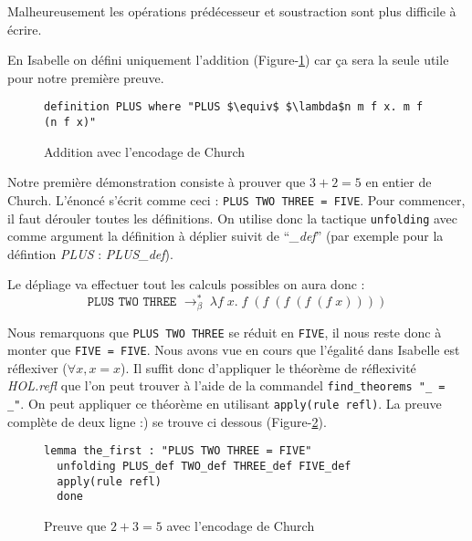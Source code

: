 \documentclass{article}
\theoremstyle{plain}
\begin{document}
  Malheureusement les opérations prédécesseur et soustraction sont plus
  difficile à écrire.

  En Isabelle on défini uniquement l'addition (Figure-\ref{fig:add}) car ça sera
  la seule utile pour notre première preuve.

    \begin{figure}[thpb]
    \begin{lstlisting}
definition PLUS where "PLUS $\equiv$ $\lambda$n m f x. m f (n f x)"
    \end{lstlisting}
    \caption{Addition avec l'encodage de Church}
    \label{fig:add}
    \end{figure}

  Notre première démonstration consiste à prouver que $3 + 2 = 5$ en entier
  de Church. L'énoncé s'écrit comme ceci : \texttt{PLUS TWO THREE = FIVE}.
  Pour commencer, il faut dérouler toutes les définitions.
  On utilise donc la tactique \texttt{unfolding} avec comme argument la
  définition à déplier suivit de ``\textit{\_def}'' (par exemple pour la
  défintion \textit{PLUS} : \textit{PLUS\_def}).

  Le dépliage va effectuer tout les calculs possibles on aura donc :
  $$
  \texttt{PLUS TWO THREE }\to^*_\beta\;\lambda f\; x.\;f\;(f\;(f\;(f\;(f\;x))))
  $$

  Nous remarquons que \texttt{PLUS TWO THREE} se réduit en \texttt{FIVE}, il
  nous reste donc à monter que \texttt{FIVE = FIVE}.
  Nous avons vue en cours que l'égalité dans Isabelle est réflexiver
  ($\forall x, x = x$). Il suffit donc d'appliquer le théorème de réflexivité
  \textit{HOL.refl} que l'on peut trouver à l'aide de la commandel
  \texttt{find\_theorems "\_ = \_"}. On peut appliquer ce théorème en utilisant
  \texttt{apply(rule refl)}. La preuve complète de deux ligne :) se trouve ci
  dessous (Figure-\ref{fig:preuve}).

    \begin{figure}[htb]
    \begin{lstlisting}
lemma the_first : "PLUS TWO THREE = FIVE"
  unfolding PLUS_def TWO_def THREE_def FIVE_def
  apply(rule refl)
  done
    \end{lstlisting}
    \caption{Preuve que $2 + 3 = 5$ avec l'encodage de Church}
    \label{fig:preuve}
    \end{figure}
\end{document}
